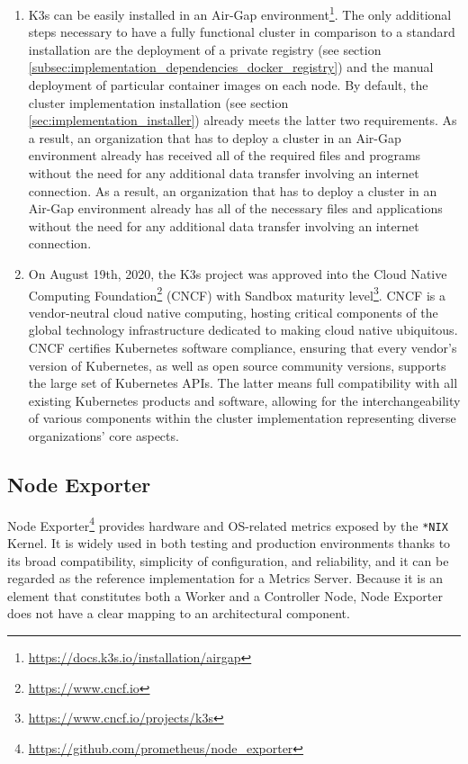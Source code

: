 \begin{enumerate}
  \item K3s can be easily installed in an Air-Gap environment\footnote{\url{https://docs.k3s.io/installation/airgap}}.
    The only additional steps necessary to have a fully functional cluster in
    comparison to a standard installation are the deployment of a private
    registry (see section \ref{subsec:implementation_dependencies_docker_registry})
    and the manual deployment of particular container images on each node.
    \newline
    By default, the cluster implementation installation (see section \ref{sec:implementation_installer})
    already meets the latter two requirements. As a result, an organization that
    has to deploy a cluster in an Air-Gap environment already has received all
    of the required files and programs without the need for any additional data
    transfer involving an internet connection. As a result, an organization that
    has to deploy a cluster in an Air-Gap environment already has all of the
    necessary files and applications without the need for any additional data
    transfer involving an internet connection.

  \item On August 19th, 2020, the K3s project was approved into the Cloud Native
    Computing Foundation\footnote{\url{https://www.cncf.io}} (CNCF) with Sandbox
    maturity level\footnote{\url{https://www.cncf.io/projects/k3s}}. CNCF is a
    vendor-neutral cloud native computing, hosting critical components of the global
    technology infrastructure dedicated to making cloud native ubiquitous. CNCF
    certifies Kubernetes software compliance, ensuring that every vendor's version
    of Kubernetes, as well as open source community versions, supports the large
    set of Kubernetes APIs. The latter means full compatibility with all
    existing Kubernetes products and software, allowing for the interchangeability
    of various components within the cluster implementation representing diverse
    organizations' core aspects.
\end{enumerate}

\subsection{Node Exporter}
\label{subsec:implementation_dependencies_node_exporter}

Node Exporter\footnote{\url{https://github.com/prometheus/node_exporter}}
provides hardware and OS-related metrics exposed by the \texttt{*NIX} Kernel. It
is widely used in both testing and production environments thanks to its broad compatibility,
simplicity of configuration, and reliability, and it can be regarded as the
reference implementation for a Metrics Server. Because it is an element that constitutes
both a Worker and a Controller Node, Node Exporter does not have a clear mapping
to an architectural component.

